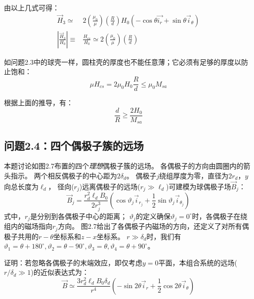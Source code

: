 由以上几式可得：
\begin{align}
\vec{H}_3 \simeq& 2\left(\frac{\mu_0}{\mu}\right) \left(\frac{R}{d}\right)H_0 (-\cos\theta \vec{i_r}+\sin\theta\vec{i}_\theta)\nonumber\\
\left|\frac{\vec{H}_3}{H_0}\right|\equiv&\frac{H_{cs}}{H_0}\simeq 2\left(\frac{\mu_0}{\mu}\right) \left(\frac{R}{d}\right)
\end{align}

如问题2.3中的球壳一样，圆柱壳的厚度也不能任意薄；它必须有足够的厚度以防止饱和：
$$\mu H_{cs}=2\mu_0 H_0 \frac{R}{d}\le \mu_0 M_{sa}$$

根据上面的推导，有：
\begin{equation}
\frac{d}{R}\ge \frac{2H_0}{M_{sa}}
\end{equation}


\subsection{问题2.4：四个偶极子簇的远场}
本题讨论如图2.7布置的四个\textit{理想}偶极子簇的远场。
各偶极子的方向由圆圈内的箭头指示。
两个相反偶极子的中心距为$2\delta_d$。
偶极子$j$绕组厚度为零，直径为$2r_d$，$y$向总长度为$\ell_d$，
径向($r_j$)远离偶极子的远场($r_j \gg \ell_d$)可建模为球偶极子场$\vec{B}_j$：
\begin{equation}
\vec{B}_j=\frac{r_d^2 \ell_d B_0}{2r_j^3}(\cos\vartheta_j \vec{i}_{r_j}+\frac{1}{2} \sin\vartheta_j \vec{i}_{\theta_j})
\end{equation}
式中，$r_j$是分别到各偶极子中心的距离；
$\vartheta_j$的定义确保$\vartheta_j=0^\circ$时，各偶极子在绕组内的磁场指向$r_j$方向。
图2.7给出了各偶极子内磁场的方向，还定义了对所有偶极子共用的$r-\theta$坐标系和$z-x$坐标系。
$r\gg \delta_d$时，我们有${\vartheta}_1=\theta+180^\circ,\vartheta_2=\theta-90^\circ,\vartheta_3=\theta,\vartheta_4=\theta + 90^\circ$。

证明：若忽略各偶极子的末端效应，即仅考虑$y=0$平面，本组合系统的远场($r/\delta_d \gg 1$)的近似表达式为：
\begin{equation}
\vec{B}\simeq \frac{3r_d^2 \ell_d B_0 \delta_d}{r^4}(-\sin 2\theta \vec{i}_r+\frac{1}{2}\cos 2\theta \vec{i}_\theta)
\end{equation}


